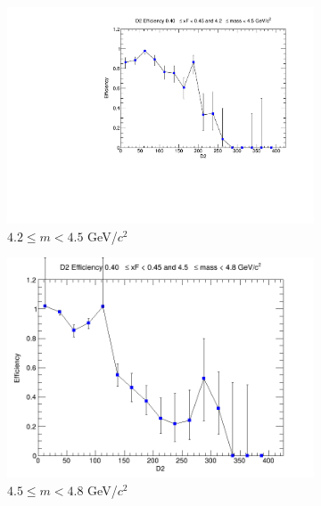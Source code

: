 \documentclass[11pt]{article}
\begin{document}
\begin{figure}[p]
    \centering
    \begin{subfigure}[b]{0.32\textwidth}
        \centering
        \includegraphics[width=\textwidth]{./kTrackerEfficiencyPlots/D2_Efficiency_xF8_mass0.pdf}
        \caption{$4.2 \leq m < 4.5$ GeV/$c^2$}
    \end{subfigure}\hfill
    \begin{subfigure}[b]{0.32\textwidth}
        \centering
        \includegraphics[width=\textwidth]{./kTrackerEfficiencyPlots/D2_Efficiency_xF8_mass1.png}
        \caption{$4.5 \leq m < 4.8$ GeV/$c^2$}
    \end{subfigure}\hfill
    \begin{subfigure}[b]{0.32\textwidth}
        \centering

\end{subfigure}
\end{figure}
\end{document}
